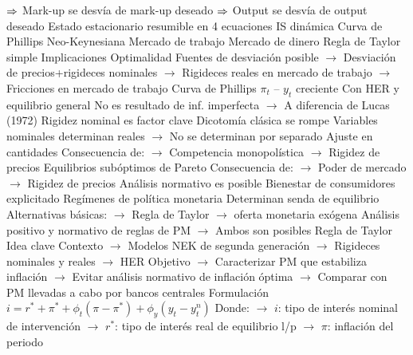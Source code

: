 \documentclass{nuevotema}
\begin{document}
\begin{esquemal}
				\4[] $\Rightarrow$ Mark-up se desvía de mark-up deseado
				\4[] $\Rightarrow$ Output se desvía de output deseado
				\4 Estado estacionario resumible en 4 ecuaciones
				\4[DIS] IS dinámica
				\4[] 
				\4[NKPC] Curva de Phillips Neo-Keynesiana
				\4[] 
				\4[WS] Mercado de trabajo
				\4[] 
				\4[MP] Mercado de dinero
				\4[] 
				\4[TR] Regla de Taylor simple
				\4[] 
			\3 Implicaciones
				\4 Optimalidad
				\4[] Fuentes de desviación posible
				\4[] $\to$ Desviación de precios+rigideces nominales
				\4[] $\to$ Rigideces reales en mercado de trabajo
				\4[] $\to$ Fricciones en mercado de trabajo
				\4 Curva de Phillips $\pi_t$ -- $y_t$ creciente
				\4[] Con HER y equilibrio general
				\4[] No es resultado de inf. imperfecta
				\4[] $\to$ A diferencia de Lucas (1972)
				\4[] Rigidez nominal es factor clave
				\4 Dicotomía clásica se rompe
				\4[] Variables nominales determinan reales
				\4[] $\to$ No se determinan por separado
				\4 Ajuste en cantidades
				\4[] Consecuencia de:
				\4[] $\to$ Competencia monopolística
				\4[] $\to$ Rigidez de precios
				\4 Equilibrios subóptimos de Pareto
				\4[] Consecuencia de:
				\4[] $\to$ Poder de mercado
				\4[] $\to$ Rigidez de precios
				\4 Análisis normativo es posible
				\4[] Bienestar de consumidores explicitado
				\4 Regímenes de política monetaria
				\4[] Determinan senda de equilibrio
				\4[] Alternativas básicas:
				\4[] $\to$ Regla de Taylor
				\4[] $\to$ oferta monetaria exógena
				\4[] Análisis positivo y normativo de reglas de PM
				\4[] $\to$ Ambos son posibles
			\3 Regla de Taylor
				\4 Idea clave
				\4[] Contexto
				\4[] $\to$ Modelos NEK de segunda generación
				\4[] $\to$ Rigideces nominales y reales
				\4[] $\to$ HER
				\4[] Objetivo
				\4[] $\to$ Caracterizar PM que estabiliza inflación
				\4[] $\to$ Evitar análisis normativo de inflación óptima
				\4[] $\to$ Comparar con PM llevadas a cabo por bancos centrales
				\4 Formulación
				\4[] $i = r^* + \pi^* + \phi_t (\pi - \pi^*) + \phi_y (y_t - y_t^n)$
				\4[] Donde:
				\4[] $\to$ $i$: tipo de interés nominal de intervención
				\4[] $\to$ $r^*$: tipo de interés real de equilibrio l/p
				\4[] $\to$ $\pi$: inflación del periodo

\end{esquemal}
\end{document}
